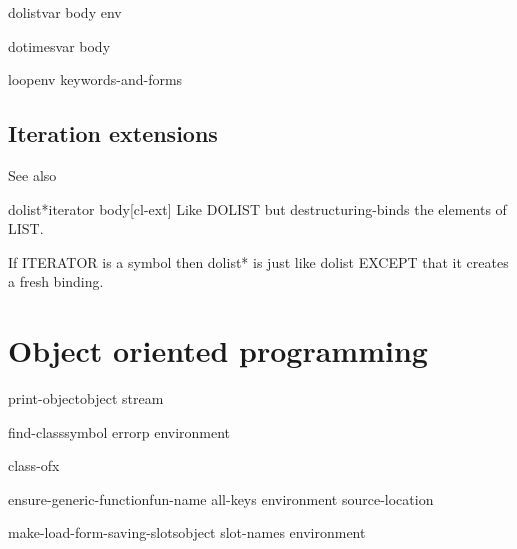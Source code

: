 \documentclass[10pt,english]{book}
\begin{document}
\begin{macro}{dolist}{var \body body \env env}
  
\end{macro}

\begin{macro}{dotimes}{var \body body}
  
\end{macro}

\begin{macro}{loop}{\env env \rest keywords-and-forms}
  
\end{macro}

\section{Iteration extensions}
\label{sec:iteration-extensions}

See also 

\begin{macro}{dolist*}{iterator \body body}[cl-ext]
  Like DOLIST but destructuring-binds the elements of LIST.

If ITERATOR is a symbol then dolist* is just like dolist EXCEPT
that it creates a fresh binding.
\end{macro}


\chapter{Object oriented programming}

\begin{generic}{print-object}{object stream}
  
\end{generic}

\begin{accessor}{find-class}{symbol \op errorp environment}
  
\end{accessor}

\begin{function}{class-of}{x}
  
\end{function}

\begin{function}{ensure-generic-function}{fun-name \rest all-keys \key environment source-location \akeys}
  
\end{function}

\begin{function}{make-load-form-saving-slots}{object \key slot-names environment}
  
\end{function}
\end{document}
